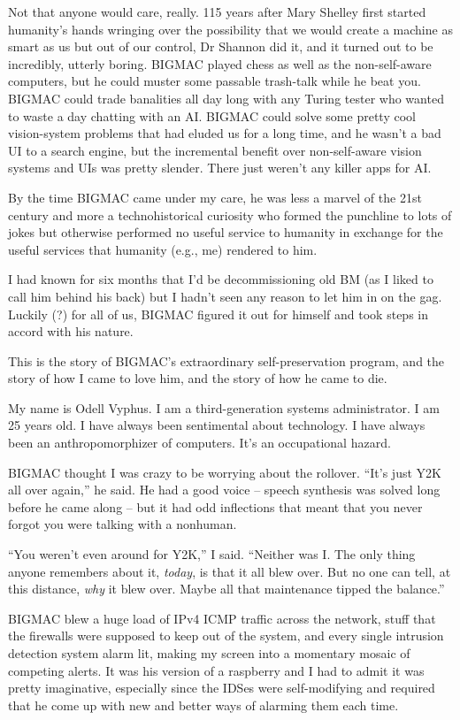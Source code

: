 Not that anyone would care, really. 115 years after Mary Shelley first 
started humanity's hands wringing over the possibility that we would 
create a machine as smart as us but out of our control, Dr Shannon did 
it, and it turned out to be incredibly, utterly boring. BIGMAC played 
chess as well as the non-self-aware computers, but he could muster some 
passable trash-talk while he beat you. BIGMAC could trade banalities 
all day long with any Turing tester who wanted to waste a day chatting 
with an AI. BIGMAC could solve some pretty cool vision-system problems 
that had eluded us for a long time, and he wasn't a bad UI to a search 
engine, but the incremental benefit over non-self-aware vision systems 
and UIs was pretty slender. There just weren't any killer apps for AI.

By the time BIGMAC came under my care, he was less a marvel of the 21st 
century and more a technohistorical curiosity who formed the punchline 
to lots of jokes but otherwise performed no useful service to humanity 
in exchange for the useful services that humanity (e.g., me) rendered 
to him.

I had known for six months that I'd be decommissioning old BM (as I 
liked to call him behind his back) but I hadn't seen any reason to let 
him in on the gag. Luckily (?) for all of us, BIGMAC figured it out for 
himself and took steps in accord with his nature.

This is the story of BIGMAC's extraordinary self-preservation program, 
and the story of how I came to love him, and the story of how he came 
to die.

My name is Odell Vyphus. I am a third-generation systems administrator. 
I am 25 years old. I have always been sentimental about technology. I 
have always been an anthropomorphizer of computers. It's an 
occupational hazard.

\tb

BIGMAC thought I was crazy to be worrying about the rollover. “It's 
just Y2K all over again,” he said. He had a good voice -- speech 
synthesis was solved long before he came along -- but it had odd 
inflections that meant that you never forgot you were talking with a 
nonhuman.

“You weren't even around for Y2K,” I said. “Neither was I. The 
only thing anyone remembers about it, \emph{today}, is that it all blew 
over. But no one can tell, at this distance, \emph{why} it blew over. 
Maybe all that maintenance tipped the balance.”

BIGMAC blew a huge load of IPv4 ICMP traffic across the network, stuff 
that the firewalls were supposed to keep out of the system, and every 
single intrusion detection system alarm lit, making my screen into a 
momentary mosaic of competing alerts. It was his version of a raspberry 
and I had to admit it was pretty imaginative, especially since the 
IDSes were self-modifying and required that he come up with new and 
better ways of alarming them each time.

